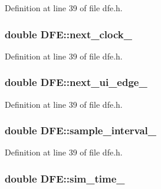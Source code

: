 Definition at line 39 of file dfe.\+h.

\hypertarget{class_d_f_e_a2fd951edceae312dfae55c5708905798}{}
\subsubsection[{next\+\_\+clock\+\_\+}]{\setlength{\rightskip}{0pt plus 5cm}double D\+F\+E\+::next\+\_\+clock\+\_\+\hspace{0.3cm}{\ttfamily [protected]}}\label{class_d_f_e_a2fd951edceae312dfae55c5708905798}


Definition at line 39 of file dfe.\+h.

\hypertarget{class_d_f_e_a3b73aff8ad9982b1585697d51dbeb038}{}
\subsubsection[{next\+\_\+ui\+\_\+edge\+\_\+}]{\setlength{\rightskip}{0pt plus 5cm}double D\+F\+E\+::next\+\_\+ui\+\_\+edge\+\_\+\hspace{0.3cm}{\ttfamily [protected]}}\label{class_d_f_e_a3b73aff8ad9982b1585697d51dbeb038}


Definition at line 39 of file dfe.\+h.

\hypertarget{class_d_f_e_ae99b54abc902423f71f31f7d37e86b78}{}
\subsubsection[{sample\+\_\+interval\+\_\+}]{\setlength{\rightskip}{0pt plus 5cm}double D\+F\+E\+::sample\+\_\+interval\+\_\+\hspace{0.3cm}{\ttfamily [protected]}}\label{class_d_f_e_ae99b54abc902423f71f31f7d37e86b78}


Definition at line 39 of file dfe.\+h.

\hypertarget{class_d_f_e_a0d576f9f42246365b5be98add1fe21d8}{}
\subsubsection[{sim\+\_\+time\+\_\+}]{\setlength{\rightskip}{0pt plus 5cm}double D\+F\+E\+::sim\+\_\+time\+\_\+\hspace{0.3cm}{\ttfamily [protected]}}\label{class_d_f_e_a0d576f9f42246365b5be98add1fe21d8}


